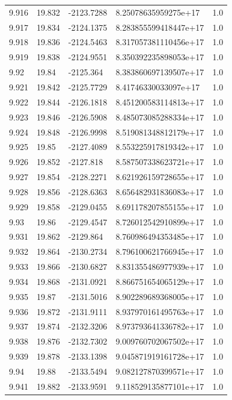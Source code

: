 \begin{tabular}{lllll}
9.916 & 19.832 & -2123.7288 & 8.25078635959275e+17 & 1.0 \\
9.917 & 19.834 & -2124.1375 & 8.283855599418447e+17 & 1.0 \\
9.918 & 19.836 & -2124.5463 & 8.317057381110456e+17 & 1.0 \\
9.919 & 19.838 & -2124.9551 & 8.350392235898053e+17 & 1.0 \\
9.92 & 19.84 & -2125.364 & 8.383860697139507e+17 & 1.0 \\
9.921 & 19.842 & -2125.7729 & 8.41746330033097e+17 & 1.0 \\
9.922 & 19.844 & -2126.1818 & 8.451200583114813e+17 & 1.0 \\
9.923 & 19.846 & -2126.5908 & 8.485073085288334e+17 & 1.0 \\
9.924 & 19.848 & -2126.9998 & 8.519081348812179e+17 & 1.0 \\
9.925 & 19.85 & -2127.4089 & 8.553225917819342e+17 & 1.0 \\
9.926 & 19.852 & -2127.818 & 8.587507338623721e+17 & 1.0 \\
9.927 & 19.854 & -2128.2271 & 8.621926159728655e+17 & 1.0 \\
9.928 & 19.856 & -2128.6363 & 8.656482931836083e+17 & 1.0 \\
9.929 & 19.858 & -2129.0455 & 8.691178207855155e+17 & 1.0 \\
9.93 & 19.86 & -2129.4547 & 8.726012542910899e+17 & 1.0 \\
9.931 & 19.862 & -2129.864 & 8.760986494353485e+17 & 1.0 \\
9.932 & 19.864 & -2130.2734 & 8.796100621766945e+17 & 1.0 \\
9.933 & 19.866 & -2130.6827 & 8.831355486977939e+17 & 1.0 \\
9.934 & 19.868 & -2131.0921 & 8.866751654065129e+17 & 1.0 \\
9.935 & 19.87 & -2131.5016 & 8.902289689368005e+17 & 1.0 \\
9.936 & 19.872 & -2131.9111 & 8.937970161495763e+17 & 1.0 \\
9.937 & 19.874 & -2132.3206 & 8.973793641336782e+17 & 1.0 \\
9.938 & 19.876 & -2132.7302 & 9.009760702067502e+17 & 1.0 \\
9.939 & 19.878 & -2133.1398 & 9.045871919161728e+17 & 1.0 \\
9.94 & 19.88 & -2133.5494 & 9.082127870399571e+17 & 1.0 \\
9.941 & 19.882 & -2133.9591 & 9.118529135877101e+17 & 1.0 \\

\end{tabular}
